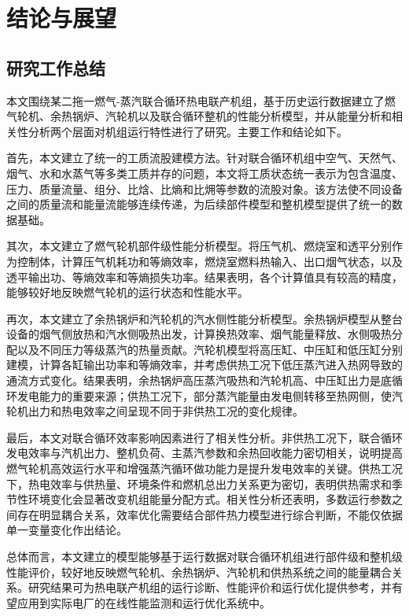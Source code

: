 \chapter{结论与展望}

\section{研究工作总结}

本文围绕某二拖一燃气-蒸汽联合循环热电联产机组，基于历史运行数据建立了燃气轮机、余热锅炉、汽轮机以及联合循环整机的性能分析模型，并从能量分析和相关性分析两个层面对机组运行特性进行了研究。主要工作和结论如下。

首先，本文建立了统一的工质流股建模方法。针对联合循环机组中空气、天然气、烟气、水和水蒸气等多类工质并存的问题，本文将工质状态统一表示为包含温度、压力、质量流量、组分、比焓、比熵和比㶲等参数的流股对象。该方法使不同设备之间的质量流和能量流能够连续传递，为后续部件模型和整机模型提供了统一的数据基础。

其次，本文建立了燃气轮机部件级性能分析模型。将压气机、燃烧室和透平分别作为控制体，计算压气机耗功和等熵效率，燃烧室燃料热输入、出口烟气状态，以及透平输出功、等熵效率和等熵损失功率。结果表明，各个计算值具有较高的精度，能够较好地反映燃气轮机的运行状态和性能水平。

再次，本文建立了余热锅炉和汽轮机的汽水侧性能分析模型。余热锅炉模型从整台设备的烟气侧放热和汽水侧吸热出发，计算换热效率、烟气能量释放、水侧吸热分配以及不同压力等级蒸汽的热量贡献。汽轮机模型将高压缸、中压缸和低压缸分别建模，计算各缸输出功率和等熵效率，并考虑供热工况下低压蒸汽进入热网导致的通流方式变化。结果表明，余热锅炉高压蒸汽吸热和汽轮机高、中压缸出力是底循环发电能力的重要来源；供热工况下，部分蒸汽能量由发电侧转移至热网侧，使汽轮机出力和热电效率之间呈现不同于非供热工况的变化规律。

最后，本文对联合循环效率影响因素进行了相关性分析。非供热工况下，联合循环发电效率与汽机出力、整机负荷、主蒸汽参数和余热回收能力密切相关，说明提高燃气轮机高效运行水平和增强蒸汽循环做功能力是提升发电效率的关键。供热工况下，热电效率与供热量、环境条件和燃机总出力关系更为密切，表明供热需求和季节性环境变化会显著改变机组能量分配方式。相关性分析还表明，多数运行参数之间存在明显耦合关系，效率优化需要结合部件热力模型进行综合判断，不能仅依据单一变量变化作出结论。

总体而言，本文建立的模型能够基于运行数据对联合循环机组进行部件级和整机级性能评价，较好地反映燃气轮机、余热锅炉、汽轮机和供热系统之间的能量耦合关系。研究结果可为热电联产机组的运行诊断、性能评价和运行优化提供参考，并有望应用到实际电厂的在线性能监测和运行优化系统中。

